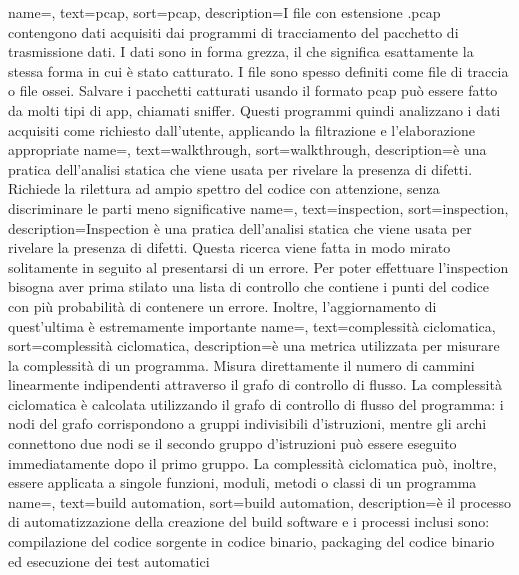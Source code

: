 {
name=,
text=pcap,
sort=pcap,
description={I file con estensione .pcap contengono dati acquisiti dai programmi di tracciamento del pacchetto di trasmissione dati.
I dati sono in forma grezza, il che significa esattamente la stessa forma in cui è stato catturato.
I file sono spesso definiti come file di traccia o file ossei.
Salvare i pacchetti catturati usando il formato pcap può essere fatto da molti tipi di app, chiamati sniffer.
Questi programmi quindi analizzano i dati acquisiti come richiesto dall'utente, applicando la filtrazione e l'elaborazione appropriate}
}
{
name=,
text=walkthrough,
sort=walkthrough,
description={è una pratica dell’analisi statica che viene usata per rivelare la presenza di difetti.
Richiede la rilettura ad ampio spettro del codice con attenzione, senza discriminare le parti meno significative}
}
{
name=,
text=inspection,
sort=inspection,
description={Inspection è una pratica dell’analisi statica che viene usata per rivelare la presenza di difetti.
Questa ricerca viene fatta in modo mirato solitamente in seguito al presentarsi di un errore.
Per poter effettuare l'inspection bisogna aver prima stilato una lista di controllo che contiene i punti del codice con più probabilità di contenere un errore. Inoltre, l'aggiornamento di quest'ultima è estremamente importante}
}
{
name=,
text=complessità ciclomatica,
sort=complessità ciclomatica,
description={è una metrica utilizzata per misurare la complessità di un programma.
Misura direttamente il numero di cammini linearmente indipendenti attraverso il grafo di controllo di flusso.
La complessità ciclomatica è calcolata utilizzando il grafo di controllo di flusso del programma: i nodi del grafo corrispondono a gruppi indivisibili d'istruzioni, mentre gli archi connettono due nodi se il secondo gruppo d'istruzioni può essere eseguito immediatamente dopo il primo gruppo.
La complessità ciclomatica può, inoltre, essere applicata a singole funzioni, moduli, metodi o classi di un programma\cite{site:complessita_ciclomatica} }
}
{
name=,
text=build automation,
sort=build automation,
description={è il processo di automatizzazione della creazione del build software e i processi inclusi sono: compilazione del codice sorgente in codice binario, packaging del codice binario ed esecuzione dei test automatici}
}

